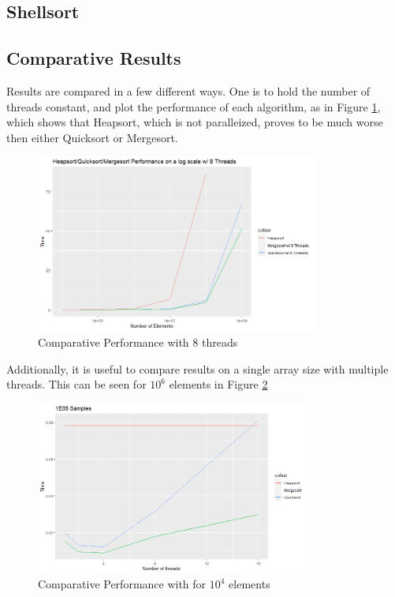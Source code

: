 \documentclass[conference]{IEEEtran}
\begin{document}
    
    
    \subsection{Shellsort}
    
    
    \subsection{Comparative Results}
    Results are compared in a few different ways. 
    One is to hold the number of threads constant, and plot the performance of each algorithm, as in Figure \ref{msqshs}, which shows that Heapsort, which is not paralleized, proves to be much worse then either Quicksort or Mergesort.
    \begin{figure}
        \includegraphics[width=9.25cm]{mshsqs.png} 
        \caption{Comparative Performance with 8 threads}
        \label{msqshs}
    \end{figure}
    Additionally, it is useful to compare results on a single array size with multiple threads. 
    This can be seen for $10^6$ elements in Figure \ref{1e5}
    \begin{figure}
        \includegraphics[width=9cm]{1e5.png} 
        \caption{Comparative Performance with for $10^4$ elements}
        \label{1e5}
    \end{figure}
\end{document}
